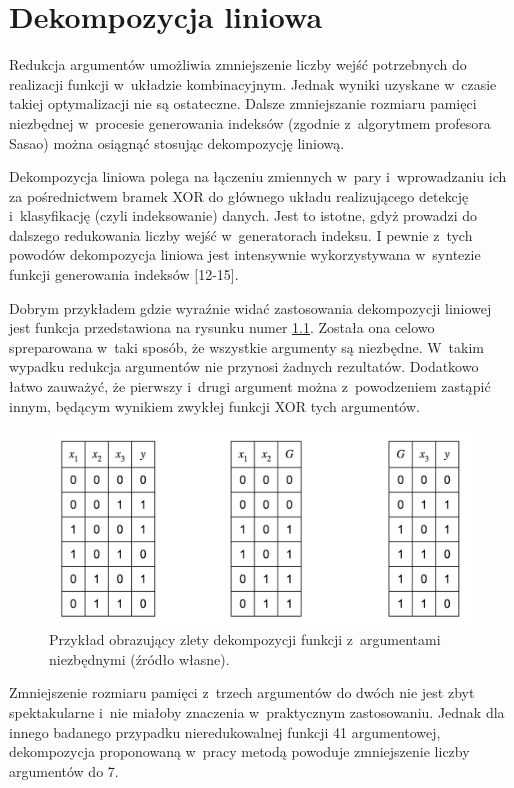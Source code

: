 \chapter{Dekompozycja liniowa}
\label{chapter:decomposition}

Redukcja argumentów umożliwia zmniejszenie liczby wejść potrzebnych do realizacji funkcji w~układzie kombinacyjnym.
Jednak wyniki uzyskane w~czasie takiej optymalizacji nie są ostateczne.
Dalsze zmniejszanie rozmiaru pamięci niezbędnej w~procesie generowania indeksów (zgodnie z~algorytmem profesora Sasao) można osiągnąć stosując dekompozycję liniową.

Dekompozycja liniowa polega na  łączeniu zmiennych w~pary i~wprowadzaniu ich za pośrednictwem bramek XOR do głównego układu realizującego detekcję i~klasyfikację (czyli indeksowanie) danych.
Jest to istotne,
gdyż prowadzi do dalszego redukowania liczby wejść w~generatorach indeksu.
I pewnie z~tych powodów dekompozycja liniowa jest intensywnie wykorzystywana w~syntezie funkcji generowania indeksów [12-15].

Dobrym przykładem gdzie wyraźnie widać zastosowania dekompozycji liniowej jest funkcja przedstawiona na rysunku numer \ref{fig:required-decomposition}.
Została ona celowo spreparowana w~taki sposób,
że wszystkie argumenty są niezbędne.
W~takim wypadku redukcja argumentów nie przynosi żadnych rezultatów.
Dodatkowo łatwo zauważyć,
że pierwszy i~drugi argument można z~powodzeniem zastąpić innym,
będącym wynikiem zwykłej funkcji XOR tych argumentów.

\begin{figure}
\centering
\includegraphics[width = 13cm]{chapter03/required-decomposition.png}
\caption{Przykład obrazujący zlety dekompozycji funkcji z~argumentami niezbędnymi (źródło własne).}
\label{fig:required-decomposition}
\end{figure}

Zmniejszenie rozmiaru pamięci z~trzech argumentów do dwóch nie jest zbyt spektakularne i~nie miałoby znaczenia w~praktycznym zastosowaniu.
Jednak dla innego badanego przypadku nieredukowalnej funkcji 41 argumentowej,
dekompozycja proponowaną w~pracy metodą powoduje zmniejszenie liczby argumentów do 7.

